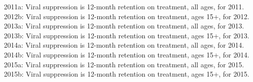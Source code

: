 2011a: Viral suppression is 12-month retention on treatment, all ages, for 2011.
2012b: Viral suppression is 12-month retention on treatment, ages 15+, for 2012.
2013a: Viral suppression is 12-month retention on treatment, all ages, for 2013.
2013b: Viral suppression is 12-month retention on treatment, ages 15+, for 2013.
2014a: Viral suppression is 12-month retention on treatment, all ages, for 2014.
2014b: Viral suppression is 12-month retention on treatment, ages 15+, for 2014.
2015a: Viral suppression is 12-month retention on treatment, all ages, for 2015.
2015b: Viral suppression is 12-month retention on treatment, ages 15+, for 2015.
